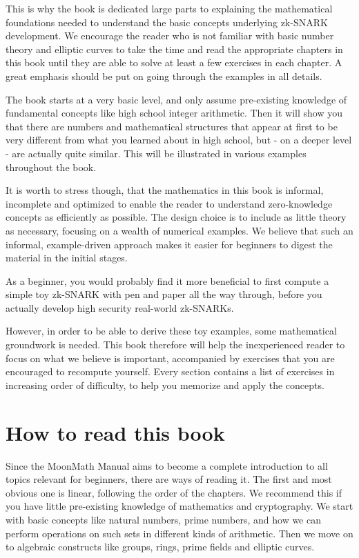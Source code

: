 This is why the book is dedicated large parts to explaining the mathematical foundations needed to understand the basic concepts underlying zk-SNARK development. We encourage the reader who is not familiar with basic number theory and elliptic curves to take the time and read the appropriate chapters in this book until they are able to solve at least a few exercises in each chapter. A great emphasis should be put on going through the examples in all details.

The book starts at a very basic level, and only assume pre-existing knowledge of fundamental concepts like high school integer arithmetic. Then it will show you that there are numbers and mathematical structures that appear at first to be very different from what you learned about in high school, but - on a deeper level - are actually quite similar. This will be illustrated in various examples throughout the book. 

It is worth to stress though, that the mathematics in this book is informal, incomplete and optimized to enable the reader to understand zero-knowledge concepts as efficiently as possible. The design choice is to include as little theory as necessary, focusing on a wealth of numerical examples. We believe that such an informal, example-driven approach makes it easier for beginners to digest the material in the initial stages. 

As a beginner, you would probably find it more beneficial to first compute a simple toy zk-SNARK with pen and paper all the way through, before you actually develop high security real-world zk-SNARKs. 

However, in order to be able to derive these toy examples, some mathematical groundwork is needed. This book therefore will help the inexperienced reader to focus on what we believe is important, accompanied by exercises that you are encouraged to recompute yourself. Every section contains a list of  exercises in increasing order of difficulty, to help you memorize and apply the concepts. 


\section{How to read this book}
Since the MoonMath Manual aims to become a complete introduction to all topics relevant for beginners, there are ways of reading it. The first and most obvious one is linear, following the order of the chapters. We recommend this if you have little pre-existing knowledge of mathematics and cryptography. We start with basic concepts like natural numbers, prime numbers, and how we can perform operations on such sets in different kinds of arithmetic. Then we move on to algebraic constructs like groups, rings, prime fields and elliptic curves.

